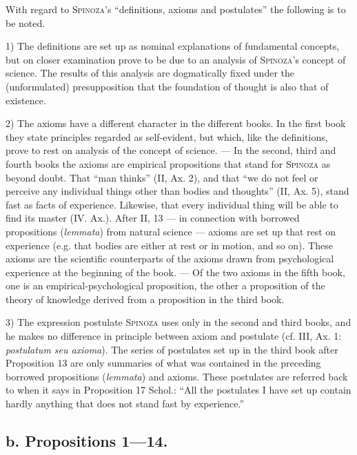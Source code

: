 \documentclass[12pt]{article}
\newcommand{\opage}[1]{\marginnote{\footnotesize\textit{[#1]}}}
\begin{document}
{\small
With regard to \textsc{Spinoza}'s ``definitions, axioms and postulates'' the following
is to be noted.

1) The definitions are set up as nominal explanations of fundamental concepts, but on
closer examination prove to be due to an analysis of \textsc{Spinoza}'s concept of
science. The results of this analysis are dogmatically fixed under the (unformulated)
presupposition that the foundation of thought is also that of existence. %
\par
2) The axioms have a different character in the different books. In the first book
they state principles regarded as self-evident, but which, like the definitions, prove
to rest on analysis of the concept of science. --- In the second, third and fourth
books the axioms are empirical propositions that stand for \textsc{Spinoza} as beyond
doubt. That ``man thinks'' (II, Ax. 2), and that ``we do not feel or perceive any
individual things other than bodies and thoughts'' (II, Ax. 5), stand fast as facts of
experience. Likewise, that every individual thing will be able to find its master (IV.
Ax.). After II, 13 --- in connection with borrowed propositions (\textit{lemmata})
from natural science --- axioms are set up that rest on experience (e.g. that bodies
are either at rest or in motion, and so on). These axioms are the scientific
counterparts of the axioms drawn from psychological experience at the beginning of the
book. --- Of the two axioms in the fifth book, one is an empirical-psychological
proposition, the other a proposition of the theory of knowledge derived from a
proposition in the third book. %
\par
3) The expression postulate \textsc{Spinoza} uses only in the second and third books,
and he makes no difference in principle between axiom and postulate (cf. III, Ax. 1:
\textit{postulatum seu axioma}). The series of postulates set up in the third book
after Proposition 13 are only summaries of what was contained in the preceding
borrowed propositions (\textit{lemmata}) and axioms. These postulates are referred
back to when it says in Proposition 17 Schol.: ``All the postulates I have set up
contain hardly anything that does not stand fast by experience.''\par}

\opage{19}\subsection*{b. Propositions 1---14.}
\end{document}
